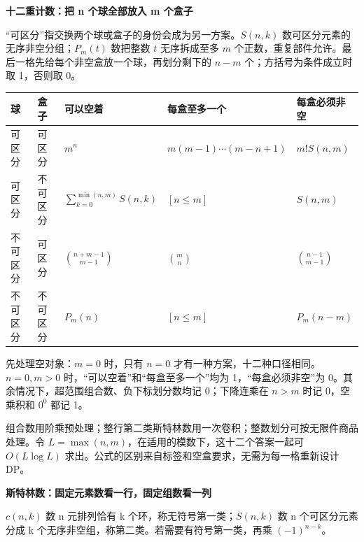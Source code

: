 \documentclass[10pt,a4paper]{article}
\newcommand{\grouphead}[1]{\needspace{7\baselineskip}\par\vspace{7pt}{\large\bfseries #1}\par\vspace{5pt}}
\begin{document}
\clearpage{}\label{tables}\grouphead{C 计数计算表与链递推}
\begingroup\fontsize{10}{14.5}\selectfont\setlength{\tabcolsep}{5pt}\renewcommand{\arraystretch}{1.55}
\textbf{\color{Accent}十二重计数：把 n 个球全部放入 m 个盒子}\par\vspace{5pt}
“可区分”指交换两个球或盒子的身份会成为另一方案。\(S(n,k)\) 数可区分元素的无序非空分组；\(P_m(t)\) 数把整数 \(t\) 无序拆成至多 \(m\) 个正数，重复部件允许。最后一格先给每个非空盒放一个球，再划分剩下的 \(n-m\) 个；方括号为条件成立时取 1，否则取 0。\par\vspace{4pt}
\begin{tabularx}{\linewidth}{ll>{\raggedright\arraybackslash}X>{\raggedright\arraybackslash}X>{\raggedright\arraybackslash}X}\toprule
球 & 盒子 & 可以空着 & 每盒至多一个 & 每盒必须非空\\\midrule
可区分 & 可区分 & \(m^n\) & \(m(m-1)\cdots(m-n+1)\) & \(m!S(n,m)\)\\
可区分 & 不可区分 & \(\sum_{k=0}^{\min(n,m)}S(n,k)\) & \([n\le m]\) & \(S(n,m)\)\\
不可区分 & 可区分 & \(\binom{n+m-1}{m-1}\) & \(\binom mn\) & \(\binom{n-1}{m-1}\)\\
不可区分 & 不可区分 & \(P_m(n)\) & \([n\le m]\) & \(P_m(n-m)\)\\
\bottomrule\end{tabularx}\par\vspace{5pt}
先处理空对象：\(m=0\) 时，只有 \(n=0\) 才有一种方案，十二种口径相同。\(n=0,m>0\) 时，“可以空着”和“每盒至多一个”均为 1，“每盒必须非空”为 0。其余情况下，超范围组合数、负下标划分数均记 0；下降连乘在 \(n>m\) 时记 0，空乘积和 \(0^0\) 都记 1。\par\vspace{5pt}
组合数用阶乘预处理；整行第二类斯特林数用一次卷积；整数划分可按无限件商品处理。令 \(L=\max(n,m)\)，在适用的模数下，这十二个答案一起可 \(O(L\log L)\) 求出。公式的区别来自标签和空盒要求，无需为每一格重新设计 DP。\par\vspace{8pt}
\textbf{\color{Accent}斯特林数：固定元素数看一行，固定组数看一列}\par\vspace{5pt}
\(c(n,k)\) 数 n 元排列恰有 k 个环，称无符号第一类；\(S(n,k)\) 数 n 个可区分元素分成 k 个无序非空组，称第二类。若需要有符号第一类，再乘 \((-1)^{n-k}\)。\par\vspace{4pt}
\end{document}
